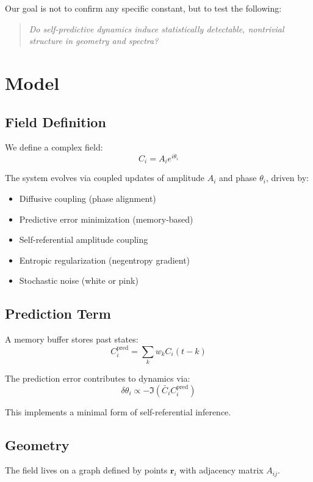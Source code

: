\documentclass[twocolumn]{article}
\begin{document}
Our goal is not to confirm any specific constant, but to test the following:

\begin{quote}
\emph{Do self-predictive dynamics induce statistically detectable, nontrivial structure in geometry and spectra?}
\end{quote}

\section{Model}

\subsection{Field Definition}

We define a complex field:
\[
C_i = A_i e^{i\theta_i}
\]

The system evolves via coupled updates of amplitude $A_i$ and phase $\theta_i$, driven by:

\begin{itemize}
\item Diffusive coupling (phase alignment)
\item Predictive error minimization (memory-based)
\item Self-referential amplitude coupling
\item Entropic regularization (negentropy gradient)
\item Stochastic noise (white or pink)
\end{itemize}

\subsection{Prediction Term}

A memory buffer stores past states:
\[
C_i^{\text{pred}} = \sum_{k} w_k C_i(t - k)
\]

The prediction error contributes to dynamics via:
\[
\delta \theta_i \propto -\Im(\bar{C}_i C_i^{\text{pred}})
\]

This implements a minimal form of self-referential inference.

\subsection{Geometry}

The field lives on a graph defined by points $\mathbf{r}_i$ with adjacency matrix $A_{ij}$.
\end{document}
